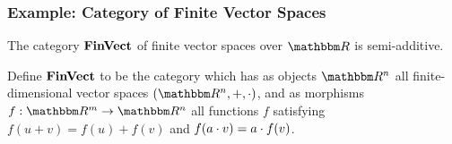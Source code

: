 \subsubsection{Example: Category of Finite Vector Spaces}
\label{sec:categories-with-biproducts:fdvect}

The category $\mathbf{FinVect}$ of finite vector spaces over $\RR$ is semi-additive.

\begin{definition}
Define $\mathbf{FinVect}$ to be the category which has as objects $\RR^n$ all finite-dimensional vector spaces
$(\RR^n, +, \mult)$, and as morphisms $f: \RR^m \to \RR^n$ all functions $f$ satisfying $f(u + v) = f(u) +
f(v)$ and $f(a \cdot v) = a \cdot f(v)$.
\end{definition}


%

